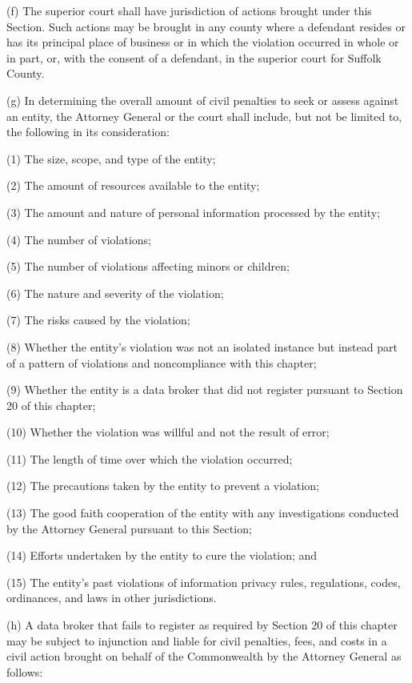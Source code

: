 (f) The superior court shall have jurisdiction of actions brought under this Section. Such actions may be brought in any county where a defendant resides or has its principal place of business or in which the violation occurred in whole or in part, or, with the consent of a defendant, in the superior court for Suffolk County.

(g) In determining the overall amount of civil penalties to seek or assess against an entity, the Attorney General or the court shall include, but not be limited to, the following in its consideration:

(1) The size, scope, and type of the entity;

(2) The amount of resources available to the entity;

(3) The amount and nature of personal information processed by the entity;

(4) The number of violations;

(5) The number of violations affecting minors or children; 

(6) The nature and severity of the violation; 

(7) The risks caused by the violation;

(8) Whether the entity’s violation was not an isolated instance but instead part of a pattern of violations and noncompliance with this chapter;

(9) Whether the entity is a data broker that did not register pursuant to Section 20 of this chapter;

(10) Whether the violation was willful and not the result of error;

(11) The length of time over which the violation occurred; 

(12) The precautions taken by the entity to prevent a violation;

(13) The good faith cooperation of the entity with any investigations conducted by the Attorney General pursuant to this Section;

(14) Efforts undertaken by the entity to cure the violation; and   

(15) The entity’s past violations of information privacy rules, regulations, codes, ordinances, and laws in other jurisdictions.

(h) A data broker that fails to register as required by Section 20 of this chapter may be subject to injunction and liable for civil penalties, fees, and costs in a civil action brought on behalf of the Commonwealth by the Attorney General as follows:

